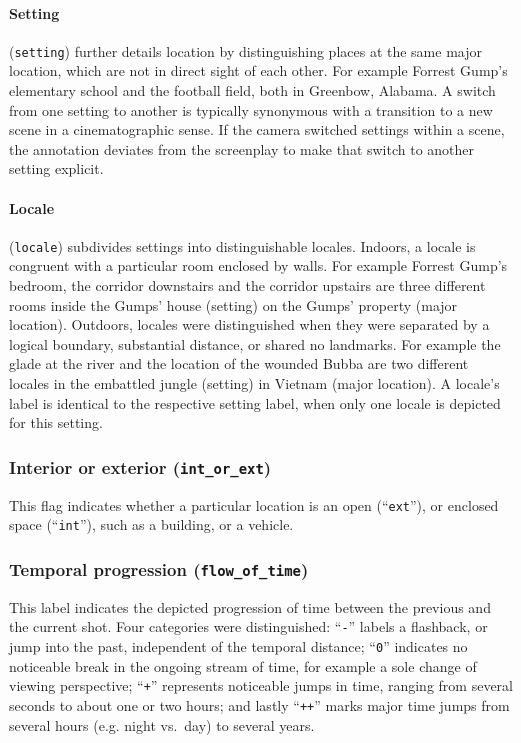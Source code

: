 \documentclass[10pt,a4paper]{article}
\begin{document}
\begin{multicols}{2}
\paragraph{Setting} (\texttt{setting}) further details location by
distinguishing places at the same major location, which are not in direct sight
of each other. For example Forrest Gump's elementary school and the football
field, both in Greenbow, Alabama. A switch from one setting to another is
typically synonymous with a transition to a new scene in a cinematographic
sense. If the camera switched settings within a scene, the annotation deviates
from the screenplay to make that switch to another setting explicit.

\paragraph{Locale} (\texttt{locale}) subdivides settings into distinguishable
locales.  Indoors, a locale is congruent with a particular room enclosed by
walls. For example Forrest Gump's bedroom, the corridor downstairs and the
corridor upstairs are three different rooms inside the Gumps' house (setting)
on the Gumps' property (major location). Outdoors, locales were distinguished
when they were separated by a logical boundary, substantial distance, or shared
no landmarks.  For example the glade at the river and the location of the
wounded Bubba are two different locales in the embattled jungle (setting) in
Vietnam (major location). A locale's label is identical to the respective
setting label, when only one locale is depicted for this setting.


\subsubsection*{Interior or exterior (\texttt{int\_or\_ext})}

This flag indicates whether a particular location is an open
(``\texttt{ext}''), or enclosed space (``\texttt{int}''), such as a building,
or a vehicle.


\subsubsection*{Temporal progression (\texttt{flow\_of\_time})}

This label indicates the depicted progression of time between the previous and
the current shot. Four categories were distinguished: ``\texttt{-}'' labels a
flashback, or jump into the past, independent of the temporal distance;
``\texttt{0}'' indicates no noticeable break in the ongoing stream of time, for
example a sole change of viewing perspective; ``\texttt{+}'' represents
noticeable jumps in time, ranging from several seconds to about one or two
hours; and lastly ``\texttt{++}'' marks major time jumps from several hours
(e.g.  night vs.~day) to several years.



\end{multicols}
\end{document}
